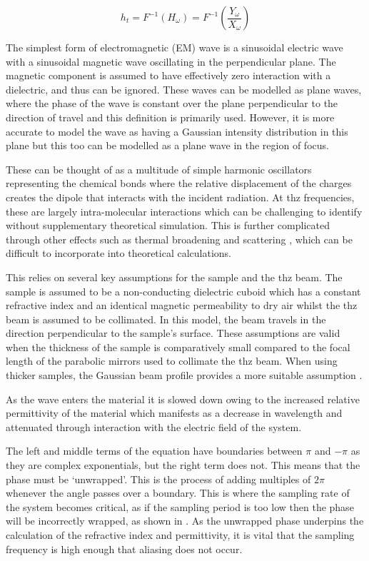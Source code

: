\begin{equation}
h_t = F^{-1}(H_{\omega}) = F^{-1}\left(\frac{Y_{\omega}}{X_{\omega}}\right)
\end{equation}

The simplest form of electromagnetic (EM) wave is a sinusoidal electric wave with a sinusoidal magnetic wave oscillating in the perpendicular plane. The magnetic component is assumed to have effectively zero interaction with a dielectric, and thus can be ignored. These waves can be modelled as plane waves, where the phase of the wave is constant over the plane perpendicular to the direction of travel and this definition is primarily used. However, it is more accurate to model the wave as having a Gaussian intensity distribution in this plane but this too can be modelled as a plane wave in the region of focus.

These can be thought of as a multitude of simple harmonic oscillators representing the chemical bonds where the relative displacement of the charges creates the dipole that interacts with the incident radiation. At \acrshort{thz} frequencies, these are largely intra-molecular interactions which can be challenging to identify without supplementary theoretical simulation. This is further complicated through other effects such as thermal broadening \cite{Walther2000} and scattering \cite{Franz2008}, which can be difficult to incorporate into theoretical calculations.

This relies on several key assumptions for the sample and the \acrshort{thz} beam. The sample is assumed to be a non-conducting dielectric cuboid which has a constant refractive index and an identical magnetic permeability to dry air whilst the \acrshort{thz} beam is assumed to be collimated. In this model, the beam travels in the direction perpendicular to the sample’s surface. These assumptions are valid when the thickness of the sample is comparatively small compared to the focal length of the parabolic mirrors used to collimate the \acrshort{thz} beam. When using thicker samples, the Gaussian beam profile provides a more suitable assumption \cite{Kuzel2000}. 

As the wave enters the material it is slowed down owing to the increased relative permittivity of the material which manifests as a decrease in wavelength and attenuated through interaction with the electric field of the system.

The left and middle terms of the equation have boundaries between \(\pi\) and \(-\pi\) as they are complex exponentials, but the right term does not. This means that the phase must be ‘unwrapped’. This is the process of adding multiples of \(2\pi\) whenever the angle passes over a boundary. This is where the sampling rate of the system becomes critical, as if the sampling period is too low then the phase will be incorrectly wrapped, as shown in . As the unwrapped phase underpins the calculation of the refractive index and permittivity, it is vital that the sampling frequency is high enough that aliasing does not occur.


